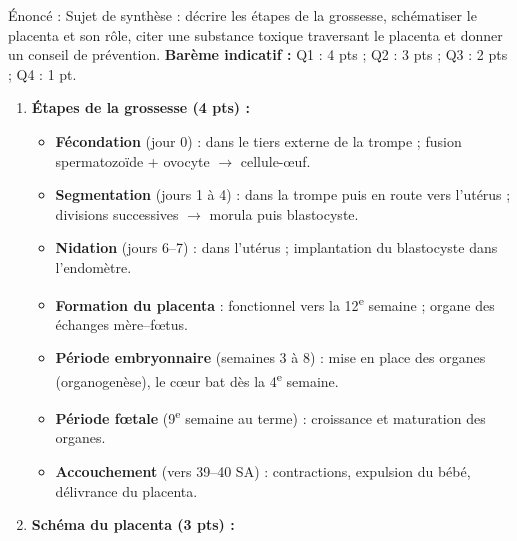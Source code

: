 \documentclass[11pt]{article}
\begin{document}
\begin{corrige}
Énoncé : Sujet de synthèse : décrire les étapes de la grossesse, schématiser le placenta et son rôle, citer une substance toxique traversant le placenta et donner un conseil de prévention.
\tcblower
\textbf{Barème indicatif :} Q1 : 4 pts ; Q2 : 3 pts ; Q3 : 2 pts ; Q4 : 1 pt.
\begin{enumerate}
\item \textbf{Étapes de la grossesse (4 pts) :}
\begin{itemize}
\item \textbf{Fécondation} (jour 0) : dans le tiers externe de la trompe ; fusion spermatozoïde + ovocyte $\to$ cellule-œuf.
\item \textbf{Segmentation} (jours 1 à 4) : dans la trompe puis en route vers l'utérus ; divisions successives $\to$ morula puis blastocyste.
\item \textbf{Nidation} (jours 6--7) : dans l'utérus ; implantation du blastocyste dans l'endomètre.
\item \textbf{Formation du placenta} : fonctionnel vers la 12\textsuperscript{e} semaine ; organe des échanges mère--fœtus.
\item \textbf{Période embryonnaire} (semaines 3 à 8) : mise en place des organes (organogenèse), le cœur bat dès la 4\textsuperscript{e} semaine.
\item \textbf{Période fœtale} (9\textsuperscript{e} semaine au terme) : croissance et maturation des organes.
\item \textbf{Accouchement} (vers 39--40 SA) : contractions, expulsion du bébé, délivrance du placenta.
\end{itemize}
\item \textbf{Schéma du placenta (3 pts) :}
\begin{popfigure}
\begin{center}
\end{center}
\end{popfigure}
\end{enumerate}
\end{corrige}
\end{document}
